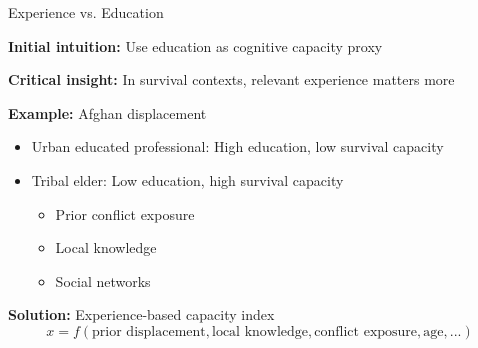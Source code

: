 \documentclass[aspectratio=169]{beamer}
\begin{document}
\begin{frame}{Experience vs. Education}

\textbf{Initial intuition:} Use education as cognitive capacity proxy

\vspace{0.5em}

\textbf{Critical insight:} In survival contexts, relevant experience matters more

\vspace{0.5em}

\textbf{Example:} Afghan displacement
\begin{itemize}
    \item Urban educated professional: High education, \alert{low survival capacity}
    \item Tribal elder: Low education, \alert{high survival capacity}
    \begin{itemize}
        \item Prior conflict exposure
        \item Local knowledge  
        \item Social networks
    \end{itemize}
\end{itemize}

\vspace{0.5em}

\textbf{Solution:} Experience-based capacity index
\begin{equation*}
x = f(\text{prior displacement}, \text{local knowledge}, \text{conflict exposure}, \text{age}, ...)
\end{equation*}

\end{frame}
\end{document}
